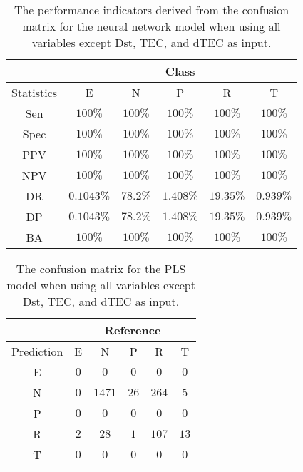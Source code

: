 \begin{table}[!ht]
	\centering
	\begin{tabular}{|c|c|c|c|c|c|}
		\hline
		 & \multicolumn{5}{c|}{Class} \\ \hline
		Statistics & E & N & P & R & T \\ \hline
		Sen & $100\%$ & $100\%$ & $100\%$ & $100\%$ & $100\%$ \\ \hline
		Spec & $100\%$ & $100\%$ & $100\%$ & $100\%$ & $100\%$ \\ \hline
		PPV & $100\%$ & $100\%$ & $100\%$ & $100\%$ & $100\%$ \\ \hline
		NPV & $100\%$ & $100\%$ & $100\%$ & $100\%$ & $100\%$ \\ \hline
		DR & $0.1043\%$ & $78.2\%$ & $1.408\%$ & $19.35\%$ & $0.939\%$ \\ \hline
		DP & $0.1043\%$ & $78.2\%$ & $1.408\%$ & $19.35\%$ & $0.939\%$ \\ \hline
		BA & $100\%$ & $100\%$ & $100\%$ & $100\%$ & $100\%$ \\ \hline
	\end{tabular}
	\caption{The performance indicators derived from the confusion matrix for the neural network model when using all variables except Dst, TEC, and dTEC as input.}
	\label{tab:cs:reverse:noTEC:nnet}
\end{table}

\begin{table}[!ht]
	\centering
	\begin{tabular}{|c|c|c|c|c|c|}
		\hline
		 & \multicolumn{5}{|c|}{Reference} \\ \hline
		 Prediction & E & N & P & R & T \\ \hline
		 E & $0$ & $0$ & $0$ & $0$ & $0$ \\ \hline
		 N & $0$ & $1471$ & $26$ & $264$ & $5$ \\ \hline
		 P & $0$ & $0$ & $0$ & $0$ & $0$ \\ \hline
		 R & $2$ & $28$ & $1$ & $107$ & $13$ \\ \hline
		 T & $0$ & $0$ & $0$ & $0$ & $0$ \\ \hline
	\end{tabular}
	\caption{The confusion matrix for the PLS model when using all variables except Dst, TEC, and dTEC as input.}
	\label{tab:cm:noTEC:pls}
\end{table}

